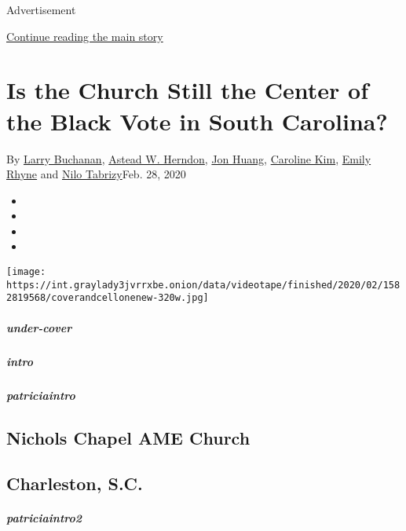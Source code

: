 Advertisement

\protect\hyperlink{after-top}{Continue reading the main story}

\hypertarget{is-the-church-still-the-center-of-the-black-vote-in-south-carolina}{%
\section{Is the Church Still the Center of the Black Vote in South
Carolina?}\label{is-the-church-still-the-center-of-the-black-vote-in-south-carolina}}

By \href{https://www.nytimes3xbfgragh.onion/by/larry-buchanan}{Larry
Buchanan},
\href{https://www.nytimes3xbfgragh.onion/by/astead-w-herndon}{Astead W.
Herndon}, \href{https://www.nytimes3xbfgragh.onion/by/jon-huang}{Jon
Huang},
\href{https://www.nytimes3xbfgragh.onion/by/caroline-kim}{Caroline Kim},
\href{https://www.nytimes3xbfgragh.onion/by/emily-rhyne}{Emily Rhyne}
and \href{https://www.nytimes3xbfgragh.onion/by/nilo-tabrizy}{Nilo
Tabrizy}Feb. 28, 2020

\begin{itemize}
\item
\item
\item
\item
\end{itemize}

\texttt{[image: https://int.graylady3jvrrxbe.onion/data/videotape/finished/2020/02/1582819568/coverandcellonenew-320w.jpg]}

\hypertarget{under-cover}{%
\subparagraph{under-cover}\label{under-cover}}

\hypertarget{intro}{%
\subparagraph{intro}\label{intro}}

\hypertarget{patriciaintro}{%
\subparagraph{patriciaintro}\label{patriciaintro}}

\hypertarget{nichols-chapel-ame-church}{%
\subsection{Nichols Chapel AME Church}\label{nichols-chapel-ame-church}}

\hypertarget{charleston-sc}{%
\subsection{Charleston, S.C.}\label{charleston-sc}}

\hypertarget{patriciaintro2}{%
\subparagraph{patriciaintro2}\label{patriciaintro2}}

